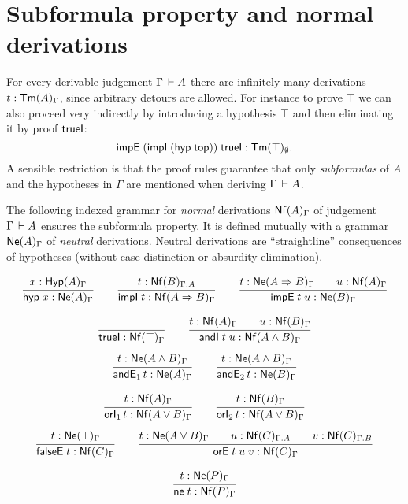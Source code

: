 \documentclass[a4paper]{article}
\begin{document}
\section{Subformula property and normal derivations}

For every derivable judgement $\Gamma \der A$ there are infinitely
many derivations $t : \TmG A$, since arbitrary detours are allowed.
For instance to prove $\top$ we can also proceed very indirectly by
introducing a hypothesis $\top$ and then eliminating it by proof
$\trueI$:
\[\impEP{\impIP{\hyp{\ttop}}}{\trueI} : \Tm[\cempty]\top.\]
A sensible restriction is that the proof rules guarantee that only
\emph{subformulas} of $A$ and the hypotheses in $\Gamma$ are mentioned when
deriving $\Gamma \der A$.

The following indexed grammar for \emph{normal} derivations $\NfG A$ of
judgement $\Gamma \der A$ ensures the subformula property.  It is
defined mutually with a grammar $\NeG A$ of \emph{neutral} derivations.
Neutral derivations are ``straightline'' consequences of hypotheses
(without case distinction or absurdity elimination).

\begin{gather*}
  \ru{x : \Hyp[\Gamma]A}{\hyp x : \NeG A}
\qquad
  \ru{t : \Nf[\Gamma.A]B}{\impI t : \NfG{A \imp B}}
\qquad
  \ru{t : \NeG{A \imp B} \qquad
      u : \NfG A
    }{\impE t u : \NeG B}
\end{gather*}

\begin{gather*}
  \ru{}{\trueI : \NfG\top}
\qquad
  \ru{t : \NfG A \qquad
      u : \NfG B
    }{\andI t u : \NfG{A \land B}
    }
\\[1ex]
  \ru{t : \NeG{A \land B}
    }{\andE1 t : \NeG A
    }
\qquad
  \ru{t : \NeG{A \land B}
    }{\andE2 t : \NeG B
    }
\end{gather*}

\begin{gather*}
  \ru{t : \NfG A
    }{\orI1 t : \NfG {A \lor B}
    }
\qquad
  \ru{t : \NfG B
    }{\orI2 t : \NfG {A \lor B}
    }
\\[1ex]
  \ru{t : \NeG \bot
    }{\falseE t : \NfG C}
\qquad
  \ru{t : \NeG {A \lor B} \qquad
      u : \Nf[\Gamma.A]C  \qquad
      v : \Nf[\Gamma.B]C
    }{\orE t u v : \NfG C}
\end{gather*}

\[
  \ru{t : \NeG P
    }{\neu t : \NfG P}
\]
\end{document}
